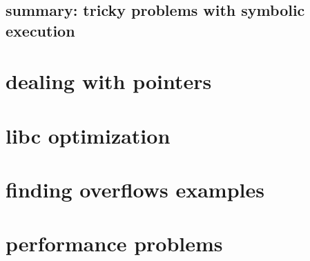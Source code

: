 \subsection{summary: tricky problems with symbolic execution}


\section{dealing with pointers}



\section{libc optimization}


\section{finding overflows examples}


\section{performance problems}


%
